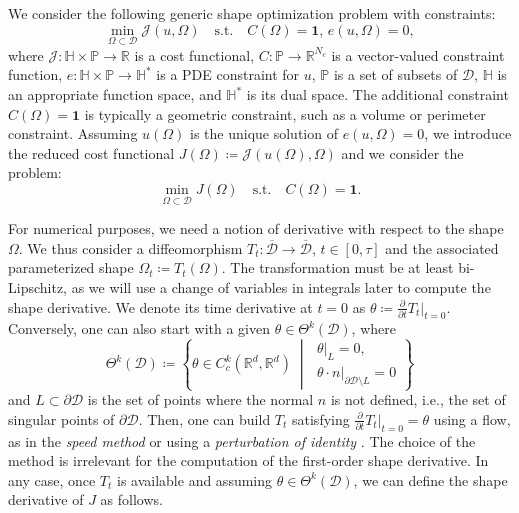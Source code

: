\documentclass[iicol,pdflatex,sn-mathphys-ay]{sn-jnl}%
\theoremstyle{thmstyleone}%
\theoremstyle{thmstyletwo}%
\theoremstyle{thmstylethree}%
\begin{document}
We consider the following generic shape optimization problem with constraints:
\begin{equation}\label{eq:problem0}
	\min_{\Omega\subset\mathcal{D}} \mathcal{J}(u,\Omega)
	\quad\text{s.t.}\quad C(\Omega)=\boldsymbol{1},\, e(u,\Omega)=0,
\end{equation}
where $\mathcal{J}\colon\mathbb{H}\times\mathds{P}\to\mathds{R}$ is a cost functional, 
$C\colon\mathds{P}\to\mathds{R}^{N_c}$ is a vector-valued constraint function,
$e\colon\mathbb{H}\times\mathds{P}\to\mathbb{H}^*$ is a PDE constraint for $u$,
$\mathds{P}$ is a set of subsets of $\mathcal{D}$,
$\mathbb{H}$ is an appropriate function space, and $\mathbb{H}^*$ is its dual space.
The additional constraint $C(\Omega)=\boldsymbol{1}$ is
typically a geometric constraint, such as a volume or perimeter constraint.
Assuming $u(\Omega)$ is the unique solution of $e(u,\Omega)=0$, 
we introduce the reduced cost functional
$J(\Omega)\coloneqq\mathcal{J}(u(\Omega),\Omega)$
and we consider the problem:
\begin{equation}\label{eq:problem}
	\min_{\Omega\subset\mathcal{D}} J(\Omega)
	\quad\text{s.t.}\quad C(\Omega)=\boldsymbol{1}.
\end{equation}

For numerical purposes, we need a notion of derivative with respect
to the shape $\Omega$.
We thus consider a diffeomorphism
$T_t\colon\overline{\mathcal{D}}\to\overline{\mathcal{D}}$, $t\in [0,\tau]$
and the associated parameterized shape $\Omega_t\coloneqq T_t(\Omega)$.
The transformation must be at least bi-Lipschitz, as we will use a change
of variables in integrals later to compute the shape derivative.
We denote its time derivative at $t=0$ as
$\theta\coloneqq\frac{\partial}{\partial t}T_t|_{t=0}$.
Conversely, one can also start with a given $\theta\in\Theta^k(\mathcal{D})$,
where
\[
	\Theta^k(\mathcal{D})\coloneqq
	\left\{
		\theta \in C^k_c(\mathds{R}^d,\mathds{R}^d)
		\;\middle|\;
		\begin{array}{l}
		\theta|_L = 0,\\
		{\theta\cdot n}|_{\partial\mathcal{D}\setminus L} = 0
		\end{array}
	\right\}
\]
and $L\subset\partial\mathcal{D}$ is the set of points
where the normal $n$ is not defined, i.e.,
the set of singular points of $\partial\mathcal{D}$.
Then, one can build $T_t$ satisfying
$\frac{\partial}{\partial t} T_t|_{t=0}=\theta$ using a flow,
as in the {\it speed method} \citep{MR2731611,MR1215733} or
using a {\it perturbation of identity} \citep{MR2512810}.
The choice of the method is irrelevant for the computation
of the first-order shape derivative.
In any case, once $T_t$ is available and assuming
$\theta\in\Theta^k(\mathcal{D})$, we can define
the shape derivative of $J$ as follows.
\end{document}
